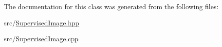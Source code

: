 The documentation for this class was generated from the following files\+:\begin{DoxyCompactItemize}
\item 
src/\hyperlink{_supervised_image_8hpp}{Supervised\+Image.\+hpp}\item 
src/\hyperlink{_supervised_image_8cpp}{Supervised\+Image.\+cpp}\end{DoxyCompactItemize}
